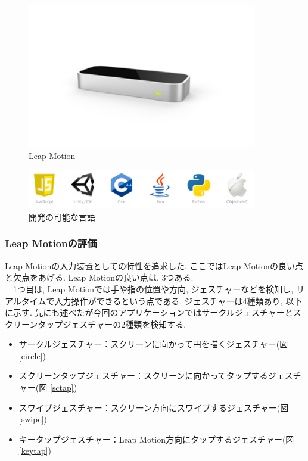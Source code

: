\documentclass{funthesis}
\begin{document}
\begin{figure}[H]
 \begin{center}
  \includegraphics[width=100mm]{./img/LeapMotion.png}
 \end{center}
 \caption{Leap Motion}
 \label{LeapMotion}
\end{figure}

\begin{figure}[H]
 \begin{center}
  \includegraphics[width=100mm]{./img/Leapdoc.png}
 \end{center}
 \caption{開発の可能な言語}
 \label{Leapdoc}
\end{figure}



\subsubsection{Leap Motionの評価}
Leap Motionの入力装置としての特性を追求した. ここではLeap Motionの良い点と欠点をあげる. Leap Motionの良い点は, 3つある. \\ 
　1つ目は, Leap Motionでは手や指の位置や方向, ジェスチャーなどを検知し, リアルタイムで入力操作ができるという点である. ジェスチャーは4種類あり, 以下に示す. 先にも述べたが今回のアプリケーションではサークルジェスチャーとスクリーンタップジェスチャーの2種類を検知する. \\

\begin{itemize}
 \item サークルジェスチャー：スクリーンに向かって円を描くジェスチャー(図 \ref{circle})
 \item スクリーンタップジェスチャー：スクリーンに向かってタップするジェスチャー(図 \ref{sctap})
 \item スワイプジェスチャー：スクリーン方向にスワイプするジェスチャー(図 \ref{swipe})
 \item キータップジェスチャー：Leap Motion方向にタップするジェスチャー(図 \ref{keytap})
\end{itemize}
\end{document}

